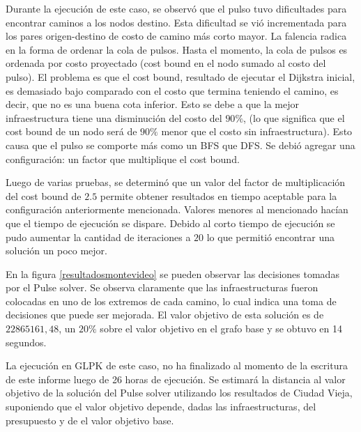 \documentclass{article}
\begin{document}
  Durante la ejecución de este caso, se observó que el pulso tuvo dificultades para encontrar caminos a los nodos destino. Esta dificultad se vió incrementada para los pares origen-destino de costo de camino más corto mayor.
  La falencia radica en la forma de ordenar la cola de pulsos. Hasta el momento, la cola de pulsos es ordenada por costo proyectado (cost bound en el nodo sumado al costo del pulso). El problema es que el cost bound, resultado de ejecutar el Dijkstra inicial, es demasiado bajo comparado con el costo que termina teniendo el camino, es decir, que no es una buena cota inferior. Esto se debe a que la mejor infraestructura tiene una disminución del costo del $90\%$, (lo que significa que el cost bound de un nodo será de $90\%$ menor que el costo sin infraestructura). Esto causa que el pulso se comporte más como un BFS que DFS. Se debió agregar una configuración: un factor que multiplique el cost bound.

  Luego de varias pruebas, se determinó que un valor del factor de multiplicación del cost bound de $2.5$ permite obtener resultados en tiempo aceptable para la configuración anteriormente mencionada. Valores menores al mencionado hacían que el tiempo de ejecución se dispare. Debido al corto tiempo de ejecución se pudo aumentar la cantidad de iteraciones a $20$ lo que permitió encontrar una solución un poco mejor.
  
  En la figura \ref{resultadosmontevideo} se pueden observar las decisiones tomadas por el Pulse solver. Se observa claramente que las infraestructuras fueron colocadas en uno de los extremos de cada camino, lo cual indica una toma de decisiones que puede ser mejorada. El valor objetivo de esta solución es de $22865161,48$, un $20\%$ sobre el valor objetivo en el grafo base y se obtuvo en 14 segundos.

  La ejecución en GLPK de este caso, no ha finalizado al momento de la escritura de este informe luego de 26 horas de ejecución. Se estimará la distancia al valor objetivo de la solución del Pulse solver utilizando los resultados de Ciudad Vieja, suponiendo que el valor objetivo depende, dadas las infraestructuras, del presupuesto y de el valor objetivo base. 
\end{document}
